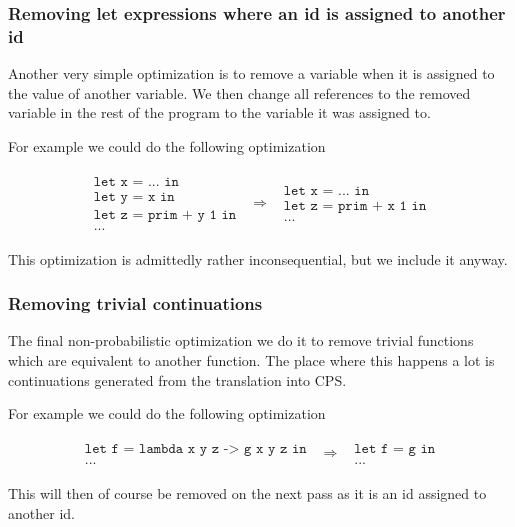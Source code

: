 \documentclass[a4paper]{article}
\newcommand{\optimization}[2]{
	\[
		\begin{array}{rcl}
			#1 & \Rightarrow & #2
		\end{array}
	\]
}
\begin{document}

\subsubsection{Removing let expressions where an id is assigned to another id}

Another very simple optimization is to remove a variable when it is assigned to the value of another variable. We then change all references to the removed variable in the rest of the program to the variable it was assigned to.

For example we could do the following optimization
\optimization{
	\begin{array}{l}
		\texttt{let x = ... in} \\
		\texttt{let y = x in} \\
		\texttt{let z = prim + y 1 in}\\
		\texttt{...}
	\end{array}
}{
	\begin{array}{l}
		\texttt{let x = ... in} \\
		\texttt{let z = prim + x 1 in}\\
		\texttt{...}
	\end{array}
}
This optimization is admittedly rather inconsequential, but we include it anyway.




\subsubsection{Removing trivial continuations}

The final non-probabilistic optimization we do it to remove trivial functions which are equivalent to another function. The place where this happens a lot is continuations generated from the translation into CPS.

For example we could do the following optimization
\optimization{
	\begin{array}{l}
		\texttt{let f = lambda x y z -> g x y z in} \\
		\texttt{...}
	\end{array}
}{
	\begin{array}{l}
		\texttt{let f = g in} \\
		\texttt{...}
	\end{array}
}
This will then of course be removed on the next pass as it is an id assigned to another id.
\end{document}
